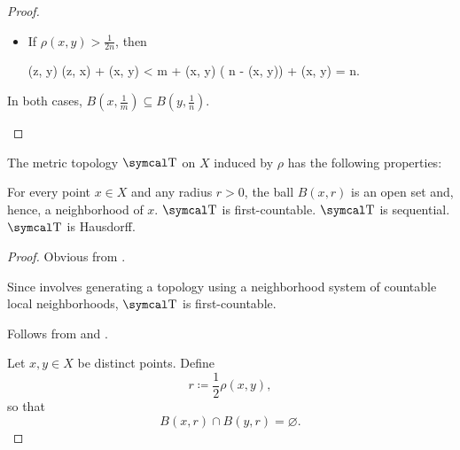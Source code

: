 \begin{proof}
\begin{RefList}
\begin{itemize}
      \item If \( \rho(x, y) > \tfrac 1 {2n} \), then
            \begin{BreakableAlign*}
              \rho(z, y)
              \leq
              \rho(z, x) + \rho(x, y)
              <
               m + \rho(x, y)
              \leq
              ( n - \rho(x, y)) + \rho(x, y)
              =
               n.
            \end{BreakableAlign*}
    \end{itemize}

    In both cases, \( B(x, \tfrac 1 m) \subseteq B(y, \tfrac 1 n) \).
  \end{RefList}
\end{proof}

\begin{proposition}\label{thm:metric_topology_properties}
  The metric topology \( \CT \) on \( X \) induced by \( \rho \) has the following properties:
  \begin{DefEnum}
     For every point \( x \in X \) and any radius \( r > 0 \), the ball \( B(x, r) \) is an open set and, hence, a neighborhood of \( x \).
     \( \CT \) is first-countable.
     \( \CT \) is sequential.
     \( \CT \) is Hausdorff.
  \end{DefEnum}
\end{proposition}
\begin{proof}
   Obvious from .

   Since  involves generating a topology using a neighborhood system of countable local neighborhoods, \( \CT \) is first-countable.

   Follows from  and .

   Let \( x, y \in X \) be distinct points. Define
  \begin{equation*}
    r \coloneqq \dfrac 1 2 \rho(x, y),
  \end{equation*}
  so that
  \begin{equation*}
    B(x, r) \cap B(y, r) = \varnothing.
  \end{equation*}
\end{proof}

